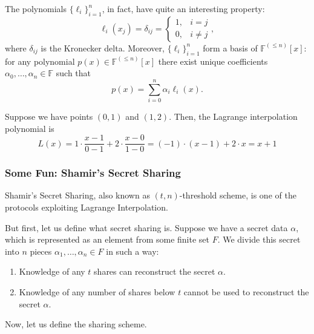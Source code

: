 \documentclass[../lecture-notes.tex]{subfiles}
\begin{document}
\begin{lemma}
    The polynomials $\{\ell_i\}_{i=1}^n$, in fact, have quite an interesting property:
    \begin{equation}
        \ell_i(x_j) = \delta_{ij} = \begin{cases}
            1, & i = j \\ 0, & i \neq j
        \end{cases},
    \end{equation}
    where $\delta_{ij}$ is the Kronecker delta. Moreover, $\{\ell_i\}_{i=1}^n$ form a basis of $\mathbb{F}^{(\leq n)}[x]$: for any polynomial $p(x) \in \mathbb{F}^{(\leq n)}[x]$ there exist unique coefficients $\alpha_0,\dots,\alpha_n \in \mathbb{F}$ such that
    \begin{equation}
        p(x) = \sum_{i=0}^{n} \alpha_i \ell_i(x).
    \end{equation}
\end{lemma}

\begin{example}
    Suppose we have points $(0,1)$ and $(1,2)$. Then, the Lagrange interpolation polynomial is
    \begin{equation}
        L(x) = 1 \cdot \frac{x-1}{0-1} + 2 \cdot \frac{x-0}{1-0} = (-1) \cdot (x-1) + 2 \cdot x = x + 1
    \end{equation}
\end{example}

\subsubsection{Some Fun: Shamir's Secret Sharing}

Shamir's Secret Sharing, also known as $(t,n)$-threshold scheme, is one of the protocols exploiting Lagrange Interpolation. 

But first, let us define what secret sharing is. Suppose we have a secret data $\alpha$, which is represented as an element from some finite set $F$. We divide this secret into $n$ pieces $\alpha_1,\dots,\alpha_n \in F$ in such a way:
\begin{enumerate}
    \item Knowledge of any $t$ shares can reconstruct the secret $\alpha$.
    \item Knowledge of any number of shares below $t$ cannot be used to reconstruct the secret $\alpha$.
\end{enumerate}

Now, let us define the sharing scheme.
\end{document}
